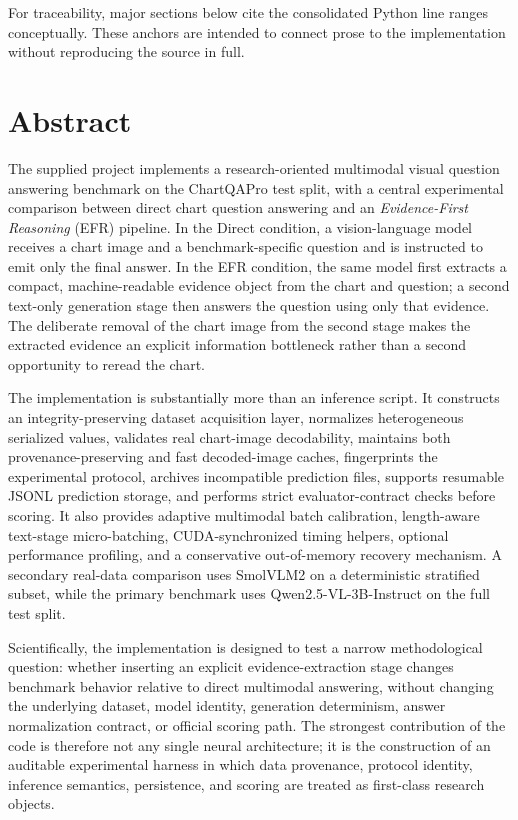 \documentclass[11pt,a4paper]{article}
\newcommand{\term}[1]{\textit{#1}}
\begin{document}
For traceability, major sections below cite the consolidated Python line ranges conceptually. These anchors are intended to connect prose to the implementation without reproducing the source in full.

\section{Abstract}
The supplied project implements a research-oriented multimodal visual question answering benchmark on the ChartQAPro test split, with a central experimental comparison between direct chart question answering and an \term{Evidence-First Reasoning} (EFR) pipeline. In the Direct condition, a vision-language model receives a chart image and a benchmark-specific question and is instructed to emit only the final answer. In the EFR condition, the same model first extracts a compact, machine-readable evidence object from the chart and question; a second text-only generation stage then answers the question using only that evidence. The deliberate removal of the chart image from the second stage makes the extracted evidence an explicit information bottleneck rather than a second opportunity to reread the chart.

The implementation is substantially more than an inference script. It constructs an integrity-preserving dataset acquisition layer, normalizes heterogeneous serialized values, validates real chart-image decodability, maintains both provenance-preserving and fast decoded-image caches, fingerprints the experimental protocol, archives incompatible prediction files, supports resumable JSONL prediction storage, and performs strict evaluator-contract checks before scoring. It also provides adaptive multimodal batch calibration, length-aware text-stage micro-batching, CUDA-synchronized timing helpers, optional performance profiling, and a conservative out-of-memory recovery mechanism. A secondary real-data comparison uses SmolVLM2 on a deterministic stratified subset, while the primary benchmark uses Qwen2.5-VL-3B-Instruct on the full test split.

Scientifically, the implementation is designed to test a narrow methodological question: whether inserting an explicit evidence-extraction stage changes benchmark behavior relative to direct multimodal answering, without changing the underlying dataset, model identity, generation determinism, answer normalization contract, or official scoring path. The strongest contribution of the code is therefore not any single neural architecture; it is the construction of an auditable experimental harness in which data provenance, protocol identity, inference semantics, persistence, and scoring are treated as first-class research objects.
\end{document}
